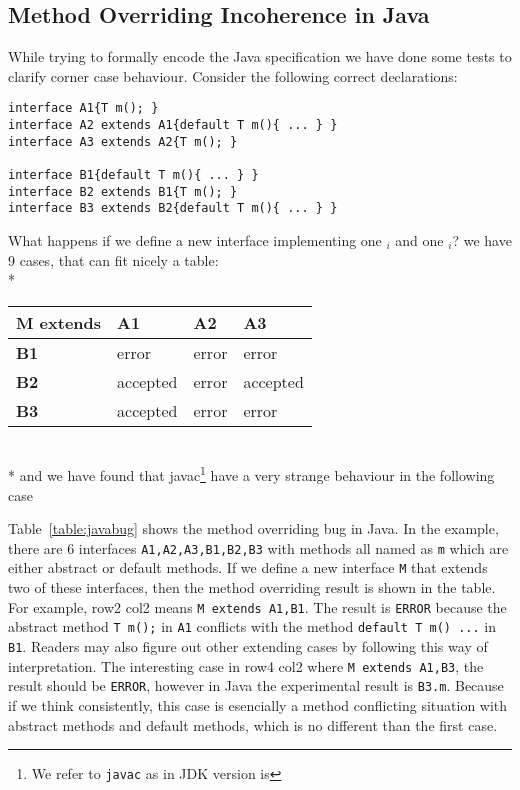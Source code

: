 \subsection{Method Overriding Incoherence in Java}
While trying to formally encode the Java specification we have done some tests to clarify corner case behaviour.
Consider the following correct declarations:
\begin{lstlisting}
interface A1{T m(); }
interface A2 extends A1{default T m(){ ... } }
interface A3 extends A2{T m(); } 

interface B1{default T m(){ ... } }
interface B2 extends B1{T m(); }
interface B3 extends B2{default T m(){ ... } }
\end{lstlisting}

What happens if we define a new interface \Q@M@ implementing one \Q@A@${}_i$ and one \Q@B@${}_i$? we have 9 cases, that can fit nicely a table:\\*

\begin{tabular}{|l|l|l|l|}
\hline
\textbf{M extends} & \textbf{A1}                  & \textbf{A2} & \textbf{A3} \\ \hline
\textbf{B1}        & error                        & error      &error       \\ \hline
\textbf{B2}        & accepted                        & error       & accepted       \\ \hline
\textbf{B3}        & \cellcolor[HTML]{C0C0C0}accepted &error       & error      \\ \hline
\end{tabular}
\\*
 and we have found that javac\footnote{We refer to \texttt{javac} as in JDK version is}
have a very strange behaviour in the following case

Table~\ref{table:javabug} shows the method overriding bug in Java. In the
example, there are 6 interfaces \texttt{A1,A2,A3,B1,B2,B3} with methods all
named as \texttt{m} which are either abstract or default methods. If we define a
new interface \texttt{M} that extends two of these interfaces, then the method
overriding result is shown in the table. For example, row2 col2 means \texttt{M
  extends A1,B1}. The result is \texttt{ERROR} because the abstract method
\texttt{T m();} in \texttt{A1} conflicts with the method \texttt{default T m()
  {...}} in \texttt{B1}. Readers may also figure out other extending cases by
following this way of interpretation. The interesting case in row4 col2 where
\texttt{M extends A1,B3}, the result should be \texttt{ERROR}, however in Java
the experimental result is \texttt{B3.m}. Because if we think consistently, this
case is esencially a method conflicting situation with abstract methods and
default methods, which is no different than the first case.

